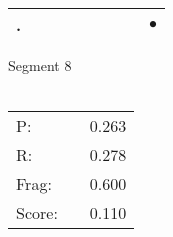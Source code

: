 \documentclass[landscape]{article}
\newcommand{\ssp}{\hspace{2pt}}
\newcommand{\mex}{\cellcolor{g}$\bullet$}
\begin{document}
\begin{tabular}{|l|p{10pt}|p{10pt}|p{10pt}|p{10pt}|p{10pt}|p{10pt}|p{10pt}|p{10pt}|}
\hline
\ssp \cellcolor{ref7}. \ssp&\hspace{2pt}&\hspace{2pt}&\hspace{2pt}&\hspace{2pt}&\hspace{2pt}&\hspace{2pt}&\hspace{2pt}&\hspace{2pt}\mex\\
\hline
\end{tabular}

\vspace{6pt}
\noindent Segment 8\\\\
\noindent\begin{tabular}{lm{12pt}r}
\hline
P:&&0.263\\
R:&&0.278\\
Frag:&&0.600\\
Score:&&0.110\\
\end{tabular}

\newpage
\end{document}
